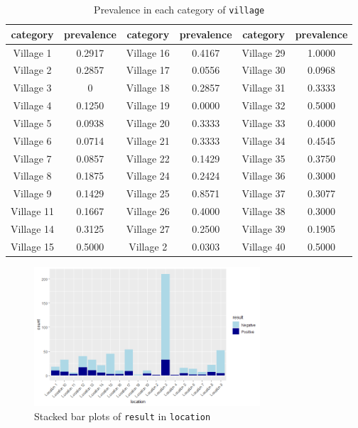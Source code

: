 \documentclass[11pt,twoside]{article}
\numberwithin{Theorem}{section}
\numberwithin{Definition}{section}
\numberwithin{Lemma}{section}
\numberwithin{Algorithm}{section}
\numberwithin{equation}{section}
\begin{document}
\begin{table}[!h]
	\centering
	\begin{tabular}{|c|c|c|c|c|c|}
		\hline
		category & prevalence & category & prevalence & category & prevalence \\
		\hline
		Village 1 & 0.2917 & Village 16 & 0.4167 & Village 29 & 1.0000 \\
		Village 2 & 0.2857 & Village 17 & 0.0556 & Village 30 & 0.0968 \\
		Village 3 & 0 & Village 18 & 0.2857 & Village 31 & 0.3333 \\
		Village 4 & 0.1250 & Village 19 & 0.0000 & Village 32 & 0.5000 \\
		Village 5 & 0.0938 & Village 20 & 0.3333 & Village 33 & 0.4000 \\
		Village 6 & 0.0714 & Village 21 & 0.3333 & Village 34 & 0.4545 \\
		Village 7 & 0.0857 & Village 22 & 0.1429 & Village 35 & 0.3750 \\
		Village 8 & 0.1875 & Village 24 & 0.2424 & Village 36 & 0.3000 \\		
		Village 9 & 0.1429 & Village 25 & 0.8571 & Village 37 & 0.3077 \\
		Village 11 & 0.1667 & Village 26 & 0.4000 & Village 38 & 0.3000 \\
		Village 14 & 0.3125 & Village 27 & 0.2500 &	Village 39 & 0.1905 \\
		Village 15 & 0.5000 & Village 2 & 0.0303 & Village 40 & 0.5000	\\
		\hline			
	\end{tabular}
	\caption{Prevalence in each category of \texttt{village}}
	\label{tab:village}
\end{table}

\begin{figure}[!h]
	\centering
	\includegraphics[width = 0.75\textwidth]{Images/location.png}
	\caption{Stacked bar plots of \texttt{result} in \texttt{location}}
	\label{fig:location}
\end{figure}
\end{document}
